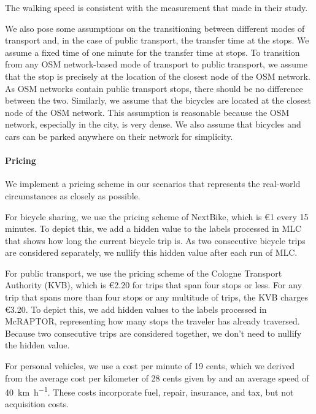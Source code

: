 The walking speed is consistent with the measurement that  made in their study.

We also pose some assumptions on the transitioning between different modes of transport and, in the case of public transport, the transfer time at the stops.
We assume a fixed time of one minute for the transfer time at stops.
To transition from any OSM network-based mode of transport to public transport, we assume that the stop is precisely at the location of the closest node of the OSM network.
As OSM networks contain public transport stops, there should be no difference between the two.
Similarly, we assume that the bicycles are located at the closest node of the OSM network.
This assumption is reasonable because the OSM network, especially in the city, is very dense.
We also assume that bicycles and cars can be parked anywhere on their network for simplicity.


\paragraph{Pricing}

We implement a pricing scheme in our scenarios that represents the real-world circumstances as closely as possible.

For bicycle sharing, we use the pricing scheme of NextBike, which is \euro{1} every 15 minutes.
To depict this, we add a hidden value to the labels processed in MLC that shows how long the current bicycle trip is.
As two consecutive bicycle trips are considered separately, we nullify this hidden value after each run of MLC.

For public transport, we use the pricing scheme of the Cologne Transport Authority (KVB), which is \euro{2.20} for trips that span four stops or less.
For any trip that spans more than four stops or any multitude of trips, the KVB charges \euro{3.20}.
To depict this, we add hidden values to the labels processed in McRAPTOR, representing how many stops the traveler has already traversed.
Because two consecutive trips are considered together, we don't need to nullify the hidden value.

For personal vehicles, we use a cost per minute of 19 cents, which we derived from the average cost per kilometer of 28 cents given by \cite{kieferSpritkostenrechner2023} and an average speed of \SI{40}{\kilo\meter\per\hour}.
These costs incorporate fuel, repair, insurance, and tax, but not acquisition costs.


